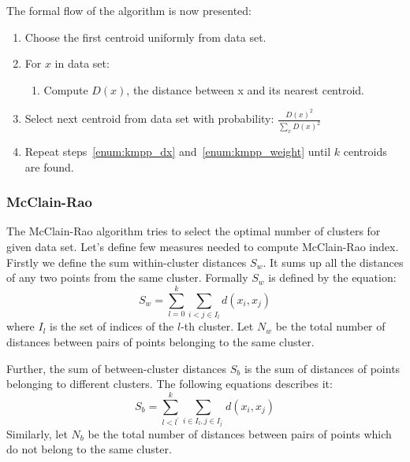 \documentclass{article}
\begin{document}
The formal flow of the algorithm is now presented:

\begin{enumerate}
	\item 
		Choose the first centroid uniformly from data set.
	\item \label{enum:kmpp_dx}
		For $x$ in data set:
		\begin{enumerate}
			\item
				Compute $D(x)$, the distance between x and its nearest centroid.
		\end{enumerate}
		
	\item \label{enum:kmpp_weight}
		Select next centroid from data set with probability:
		$\frac{D(x)^2}{\sum_{x}D(x)^2}$
	\item 
		Repeat steps~\ref{enum:kmpp_dx} and~\ref{enum:kmpp_weight} until $k$ centroids are found.
\end{enumerate}

\subsubsection{McClain-Rao}
The McClain-Rao algorithm tries to select the optimal number of clusters for given data set. Let's define few measures needed to compute McClain-Rao index. Firstly we define the sum within-cluster distances $S_w$. It sums up all the distances of any two points from the same cluster. Formally $S_w$ is defined by the equation: 
\begin{equation}
	S_w = \sum_{l=0}^{k} \sum_{i < j \in I_l} d(x_i, x_j)
\end{equation}
where $I_l$ is the set of indices of the $l$-th cluster. Let $N_w$ be the total number of distances between pairs of points belonging to the same cluster.

Further, the sum of between-cluster distances $S_b$ is the sum of distances of points belonging to different clusters. The following equations describes it:
\begin{equation}
	S_b = \sum_{l < l^{'}}^{k} \sum_{i \in I_{l}, j \in I_{l^{'}}}  d(x_i, x_j)
\end{equation}
Similarly, let $N_b$ be the total number of distances between pairs of points which do not belong to the same cluster.
\end{document}
